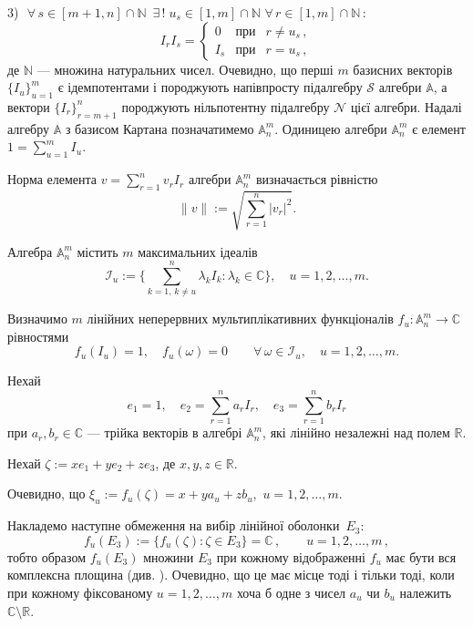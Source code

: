 \documentclass[11pt, reqno]{amsart}
\begin{document}
3)\,\, $\forall\, s\in[m+1,n]\cap\mathbb{N} \,\,\, \exists\,!\;
 u_s\in[1,m]\cap\mathbb{N}$ \; $\forall\,
 r\in[1,m]\cap\mathbb{N}\,:$\\
$$I_rI_s=\left\{
\begin{array}{lll}
0 & \mbox{при} &  r\neq u_s\,,\\[1mm]
I_s & \mbox{при} &  r= u_s\,,
\end{array}
\right.
$$
де $\mathbb{N}$ --- множина натуральних чисел.  Очевидно, що перші
$m$ базисних векторів $\{I_u\}_{u=1}^m$ є ідемпотентами і
породжують напівпросту підалгебру $\mathcal{S}$ алгебри $\mathbb{A}$, а
вектори $\{I_r\}_{r=m+1}^n$ породжують нільпотентну підалгебру $\mathcal{N}$
цієї алгебри. Надалі алгебру $\mathbb{A}$ з базисом Картана
позначатимемо $\mathbb{A}_n^m$. Одиницею алгебри $\mathbb{A}_n^m$
є елемент $1=\sum\limits_{u=1}^mI_u$.

Норма елемента $v=\sum\limits_{r=1}^nv_rI_r$ алгебри $\mathbb{A}_n^m$ визначається
рівністю
$$\|v\|:=\sqrt{\sum\limits_{r=1}^n|v_r|^2}.$$


Алгебра $\mathbb{A}_n^m$ містить $m$ максимальних ідеалів
$$\mathcal{I}_u:=\Biggr\{\sum\limits_{k=1,\,k\neq u}^n\lambda_kI_k:\lambda_k\in
\mathbb{C}\Biggr\}, \quad  u=1,2,\ldots,m.
$$

Визначимо $m$ лінійних неперервних мультиплікативних функціоналів
$f_u:\mathbb{A}_n^m\rightarrow\mathbb{C}$ рівностями
$$f_u(I_u)=1,\quad f_u(\omega)=0 \qquad\forall\,
\omega\in\mathcal{I}_u,\quad u=1,2,\ldots,m.$$

Нехай
\begin{equation}\label{e_1_e_2_e_3}
e_1=1,\quad e_2=\sum\limits_{r=1}^na_rI_r,\quad e_3=\sum\limits_{r=1}^nb_rI_r
\end{equation}
при $a_r,b_r\in\mathbb{C}$ --- трійка векторів в алгебрі
$\mathbb{A}_n^m$, які лінійно незалежні над полем
$\mathbb{R}$.

Нехай $\zeta:=xe_1+ye_2+ze_3$, де $x,y,z\in\mathbb{R}$.

Очевидно, що  $\xi_u:=f_u(\zeta)=x+ya_u+zb_u$,\, $u=1,2,\ldots,m$.

Накладемо наступне обмеження на вибір лінійної оболонки\, $E_3$:
\begin{equation}\label{3-1:cond-on-E3}
 f_u (E_3):=\{f_u(\zeta) : \zeta\in E_3\} =\mathbb{C}\,,\qquad   u=1,2,\ldots,m\,,
\end{equation}
тобто образом $f_u(E_3)$ множини $E_3$ при кожному відображенні $f_u$ має бути вся комплексна площина
(див. \cite{Pukh-5}).
Очевидно, що це має місце тоді і тільки тоді, коли при кожному
фіксованому $u=1,2, \ldots, m$ хоча б одне з чисел $a_u$ чи $b_u$
належить $\mathbb{C}\setminus\mathbb{R}$.
\end{document}
